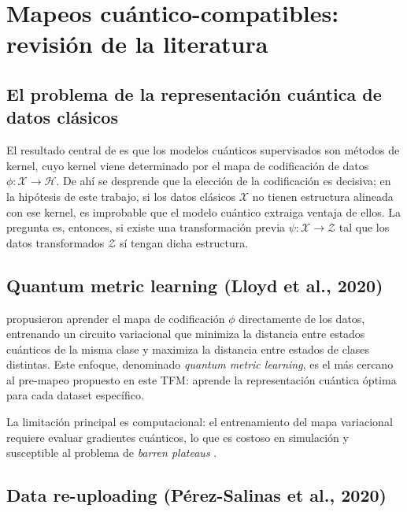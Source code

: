 \section{Mapeos cuántico-compatibles: revisión de la literatura}
\label{sec:lit_mapeos}

\subsection{El problema de la representación cuántica de datos clásicos}

El resultado central de \citet{schuld2021kernels} es que los modelos cuánticos supervisados son métodos de kernel, cuyo kernel viene determinado por el mapa de codificación de datos $\phi: \mathcal{X} \rightarrow \mathcal{H}$. De ahí se desprende que la elección de la codificación es decisiva; en la hipótesis de este trabajo, si los datos clásicos $\mathcal{X}$ no tienen estructura alineada con ese kernel, es improbable que el modelo cuántico extraiga ventaja de ellos. La pregunta es, entonces, si existe una transformación previa $\psi: \mathcal{X} \rightarrow \mathcal{Z}$ tal que los datos transformados $\mathcal{Z}$ sí tengan dicha estructura.

\subsection{Quantum metric learning (Lloyd et al., 2020)}

\citet{lloyd2020} propusieron aprender el mapa de codificación $\phi$ directamente de los datos, entrenando un circuito variacional que minimiza la distancia entre estados cuánticos de la misma clase y maximiza la distancia entre estados de clases distintas. Este enfoque, denominado \textit{quantum metric learning}, es el más cercano al pre-mapeo propuesto en este TFM: aprende la representación cuántica óptima para cada dataset específico.

La limitación principal es computacional: el entrenamiento del mapa variacional requiere evaluar gradientes cuánticos, lo que es costoso en simulación y susceptible al problema de \textit{barren plateaus} \citep{mcclean2018}.

\subsection{Data re-uploading (Pérez-Salinas et al., 2020)}

